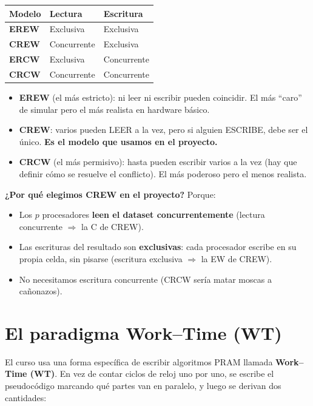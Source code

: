\documentclass[11pt,a4paper]{article}
\newcommand{\term}[1]{\textbf{\textcolor{clave}{#1}}}
\begin{document}
\begin{caja}[title=\textbf{Los 4 modelos PRAM}]
\begin{tabular}{lll}
Modelo & Lectura & Escritura \\\midrule
\textbf{EREW} & Exclusiva & Exclusiva \\
\textbf{CREW} & Concurrente & Exclusiva \\
\textbf{ERCW} & Exclusiva & Concurrente \\
\textbf{CRCW} & Concurrente & Concurrente \\
\end{tabular}
\end{caja}

\begin{itemize}
  \item \textbf{EREW} (el más estricto): ni leer ni escribir pueden coincidir. El
        más ``caro'' de simular pero el más realista en hardware básico.
  \item \textbf{CREW}: varios pueden LEER a la vez, pero si alguien ESCRIBE, debe
        ser el único. \textbf{Es el modelo que usamos en el proyecto.}
  \item \textbf{CRCW} (el más permisivo): hasta pueden escribir varios a la vez
        (hay que definir cómo se resuelve el conflicto). El más poderoso pero el
        menos realista.
\end{itemize}

\textbf{¿Por qué elegimos CREW en el proyecto?} Porque:
\begin{itemize}
  \item Los $p$ procesadores \textbf{leen el dataset concurrentemente} (lectura
        concurrente $\Rightarrow$ la C de CREW).
  \item Las escrituras del resultado son \textbf{exclusivas}: cada procesador
        escribe en su propia celda, sin pisarse (escritura exclusiva $\Rightarrow$
        la EW de CREW).
  \item No necesitamos escritura concurrente (CRCW sería matar moscas a cañonazos).
\end{itemize}

\section{El paradigma Work--Time (WT)}

El curso usa una forma específica de escribir algoritmos PRAM llamada
\term{Work--Time (WT)}. En vez de contar ciclos de reloj uno por uno, se escribe
el pseudocódigo marcando qué partes van en paralelo, y luego se derivan dos
cantidades:
\end{document}
